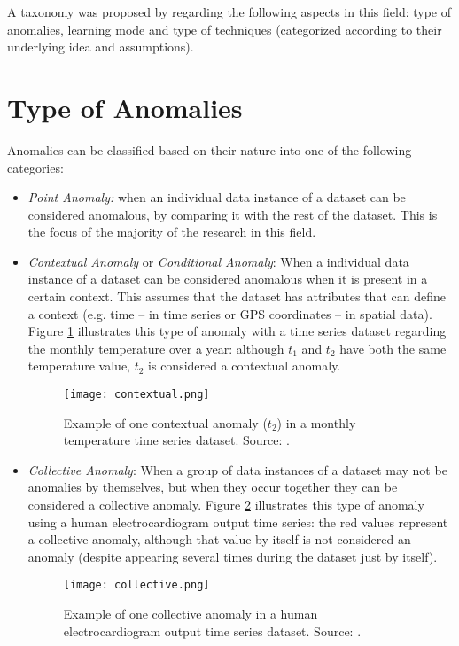 
A taxonomy was proposed by \textcite{Kandhari2009} regarding the following aspects in this field: type of anomalies, learning mode and type of techniques (categorized according to their underlying idea and assumptions).

\section{Type of Anomalies} \label{sec:anomaly_type}

Anomalies can be classified based on their nature into one of the following categories:

\begin{itemize}
	\item \textit{Point Anomaly:} when an individual data instance of a dataset can be considered anomalous, by comparing it with the rest of the dataset. This is the focus of the majority of the research in this field.
	
	\item \textit{Contextual Anomaly} or \textit{Conditional Anomaly}: When a individual data instance of a dataset can be considered anomalous when it is present in a certain context. This assumes that the dataset has attributes that can define a context (e.g. time -- in time series or GPS coordinates -- in spatial data). Figure \ref{fig:context_anom} illustrates this type of anomaly with a time series dataset regarding the monthly temperature over a year: although $t_1$ and $t_2$ have both the same temperature value, $t_2$ is considered a contextual anomaly.
	
	\begin{figure}[!ht]
		\centering
		\texttt{[image: contextual.png]}
		\caption{Example of one contextual anomaly ($t_2$) in a monthly temperature time series dataset. Source: \cite{Kandhari2009}.}
		\label{fig:context_anom}
	\end{figure}
	
	\item \textit{Collective Anomaly}: When a group of data instances of a dataset may not be anomalies by themselves, but when they occur together they can be considered a collective anomaly.
	Figure \ref{fig:collective_anom} illustrates this type of anomaly using a human electrocardiogram output time series: the red values represent a collective anomaly, although that value by itself is not considered an anomaly (despite appearing several times during the dataset just by itself).
	
	\begin{figure}[!ht]
		\centering
		\texttt{[image: collective.png]}
		\caption{Example of one collective anomaly in a human electrocardiogram output time series dataset. Source:  \cite{Kandhari2009}.}
		\label{fig:collective_anom}
	\end{figure}
	
\end{itemize}

